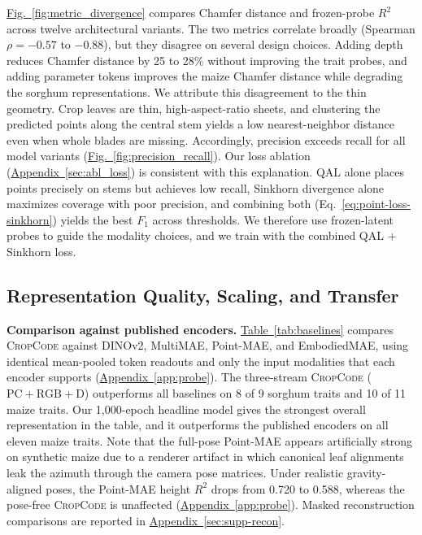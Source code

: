 \documentclass[10pt,twocolumn,letterpaper]{article}
\newcommand{\figref}[1]{\hyperref[#1]{Fig.~\ref*{#1}}}
\newcommand{\tabref}[1]{\hyperref[#1]{Table~\ref*{#1}}}
\newcommand{\appendixref}[1]{\hyperref[#1]{Appendix~\ref*{#1}}}
\newcommand{\method}{\textup{\textsc{CropCode}}}   %
\begin{document}
\figref{fig:metric_divergence} compares Chamfer distance and frozen-probe $R^2$ across twelve architectural variants. The two metrics correlate broadly (Spearman $\rho = -0.57$ to $-0.88$), but they disagree on several design choices. Adding depth reduces Chamfer distance by 25 to 28\% without improving the trait probes, and adding parameter tokens improves the maize Chamfer distance while degrading the sorghum representations. We attribute this disagreement to the thin geometry. Crop leaves are thin, high-aspect-ratio sheets, and clustering the predicted points along the central stem yields a low nearest-neighbor distance even when whole blades are missing. Accordingly, precision exceeds recall for all model variants (\figref{fig:precision_recall}). Our loss ablation (\appendixref{sec:abl_loss}) is consistent with this explanation. QAL alone places points precisely on stems but achieves low recall, Sinkhorn divergence alone maximizes coverage with poor precision, and combining both (Eq.~\ref{eq:point-loss-sinkhorn}) yields the best $F_1$ across thresholds. We therefore use frozen-latent probes to guide the modality choices, and we train with the combined QAL + Sinkhorn loss.

\subsection{Representation Quality, Scaling, and Transfer}
\label{sec:res-repr}\label{sec:exp-repr}

\noindent\textbf{Comparison against published encoders.}
\tabref{tab:baselines} compares \method{} against DINOv2, MultiMAE, Point-MAE, and EmbodiedMAE, using identical mean-pooled token readouts and only the input modalities that each encoder supports (\appendixref{app:probe}). The three-stream \method{} ($\mathrm{PC}+\mathrm{RGB}+\mathrm{D}$) outperforms all baselines on 8 of 9 sorghum traits and 10 of 11 maize traits. Our 1{,}000-epoch headline model gives the strongest overall representation in the table, and it outperforms the published encoders on all eleven maize traits. Note that the full-pose Point-MAE appears artificially strong on synthetic maize due to a renderer artifact in which canonical leaf alignments leak the azimuth through the camera pose matrices. Under realistic gravity-aligned poses, the Point-MAE height $R^2$ drops from 0.720 to 0.588, whereas the pose-free \method{} is unaffected (\appendixref{app:probe}). Masked reconstruction comparisons are reported in \appendixref{sec:supp-recon}.
\end{document}
